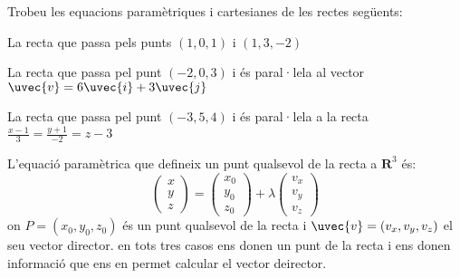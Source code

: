 \Exercise Trobeu les equacions paramètriques i cartesianes de les rectes següents:
\begin{llista}
  \item La recta que passa pels punts $(1,0,1)$ i $(1,3,-2)$
  \item La recta que passa pel punt $(-2,0,3)$ i és paral·lela al vector $\uvec{v}=6\uvec{i}+3\uvec{j}$
  \item La recta que passa pel punt $(-3,5,4)$ i és paral·lela a la recta $\frac{x-1}{3}=\frac{y+1}{-2}=z-3$
\end{llista}

\Answer L'equació paramètrica que defineix un punt qualsevol de la recta a $\mathbf{R}^3$ és:
\[
\begin{pmatrix}x\\y\\z\end{pmatrix}= \begin{pmatrix}x_0\\y_0\\z_0\end{pmatrix}+\lambda\begin{pmatrix}v_x\\v_y\\v_z\end{pmatrix}
\]
on $P=(x_0,y_0,z_0)$ és un punt qualsevol de la recta i $\uvec{v}=(v_x,v_y,v_z)$ el seu vector director. en tots tres casos ens donen un punt de la recta i ens donen informació que ens en permet calcular el vector deirector.

